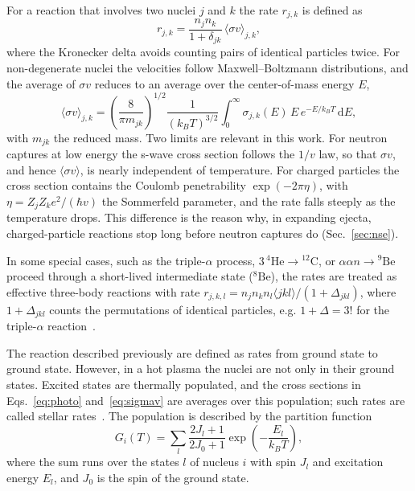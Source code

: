 For a reaction that involves two nuclei $j$ and $k$ the rate $r_{j,k}$ is defined as
\begin{equation}\label{eq:rate2}
  r_{j,k}=\frac{n_jn_k}{1+\delta_{jk}}\,\langle\sigma v\rangle_{j,k},
\end{equation}
where the Kronecker delta avoids counting pairs of identical particles twice.
For non-degenerate nuclei the velocities follow Maxwell--Boltzmann distributions, and the average of $\sigma v$ reduces to an average over the center-of-mass energy $E$,
\begin{equation}\label{eq:sigmav}
  \langle\sigma v\rangle_{j,k}=\left(\frac{8}{\pi m_{jk}}\right)^{1/2}\frac{1}{(k_BT)^{3/2}}\int_0^\infty\sigma_{j,k}(E)\,E\,e^{-E/k_BT}\,\mathrm{d}E ,
\end{equation}
with $m_{jk}$ the reduced mass.
Two limits are relevant in this work.
For neutron captures at low energy the s-wave cross section follows the $1/v$ law, so that $\sigma v$, and hence $\langle\sigma v\rangle$, is nearly independent of temperature.
For charged particles the cross section contains the Coulomb penetrability $\exp(-2\pi\eta)$, with $\eta=Z_jZ_ke^2/(\hbar v)$ the Sommerfeld parameter, and the rate falls steeply as the temperature drops.
This difference is the reason why, in expanding ejecta, charged-particle reactions stop long before neutron captures do (Sec.~\ref{sec:nse}).

In some special cases, such as the triple-$\alpha$ process, $3\,{}^4\mathrm{He}\to{}^{12}\mathrm{C}$, or $\alpha\alpha n\to{}^9\mathrm{Be}$ proceed through a short-lived intermediate state (${}^8\mathrm{Be}$), the rates are treated as effective three-body reactions with rate $r_{j,k,l}=n_jn_kn_l\langle jkl\rangle/(1+\Delta_{jkl})$, where $1+\Delta_{jkl}$ counts the permutations of identical particles, e.g. $1+\Delta=3!$ for the triple-$\alpha$ reaction~\cite{reichert_nuclear_2023}.

The reaction described previously are defined as rates from ground state to ground state.
However, in a hot plasma the nuclei are not only in their ground states.
Excited states are thermally populated, and the cross sections in Eqs.~\ref{eq:photo} and~\ref{eq:sigmav} are averages over this population; such rates are called stellar rates~\cite{fowler_thermonuclear_1967,rauscher_astrophysical_2000}.
The population is described by the partition function
\begin{equation}\label{eq:partition}
  G_i(T)=\sum_{l}\frac{2J_l+1}{2J_0+1}\exp\left(-\frac{E_l}{k_BT}\right),
\end{equation}
where the sum runs over the states $l$ of nucleus $i$ with spin $J_l$ and excitation energy $E_l$, and $J_0$ is the spin of the ground state.

